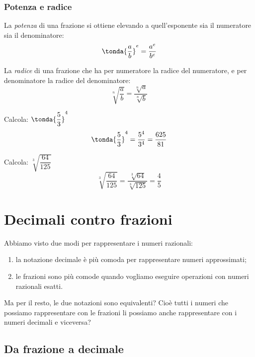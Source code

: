 \subsubsection{Potenza e radice}

\begin{definizione}
 La \emph{potenza} di una frazione si ottiene elevando a quell'esponente 
sia il numeratore sia il denominatore:
\[\tonda{\dfrac{a}{b}}^e = \dfrac{a^e}{b^e}\]
\end{definizione}

\begin{definizione}
 La \emph{radice} di una frazione che ha per numeratore la radice del  
numeratore, e per denominatore la radice del denominatore:
\[\sqrt[n]{\dfrac{a}{b}} = \dfrac{\sqrt[n]{a}}{\sqrt[n]{b}}\]
\end{definizione}

\begin{esempio}
Calcola: \(\tonda{\dfrac{5}{3}}^4\)
\[\tonda{\dfrac{5}{3}}^4 = \dfrac{5^4}{3^4} = \dfrac{625}{81}\]
\end{esempio}

\begin{esempio}
Calcola: \(\sqrt[3]{\dfrac{64}{125}}\)
\[\sqrt[3]{\dfrac{64}{125}} = \dfrac{\sqrt[3]{64}}{\sqrt[3]{125}} = 
\dfrac{4}{5}\]
\end{esempio}

\section{Decimali contro frazioni}
\label{sec:razionali_decimali_frazioni}

Abbiamo visto due modi per rappresentare i numeri razionali:
\begin{enumerate}
 \item la notazione decimale è più comoda per rappresentare numeri 
approssimati;
 \item le frazioni sono più comode quando vogliamo eseguire operazioni con 
numeri razionali esatti.
\end{enumerate}

Ma per il resto, le due notazioni sono equivalenti? Cioè tutti i numeri che 
possiamo rappresentare con le frazioni li possiamo anche rappresentare con 
i numeri decimali e viceversa?

\subsection{Da frazione a decimale}

